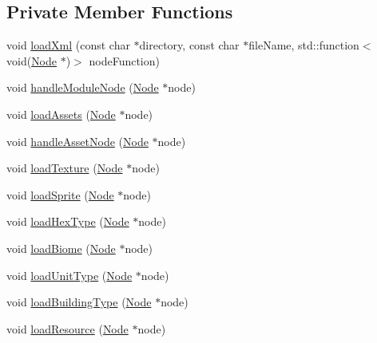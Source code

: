 \subsection*{Private Member Functions}
\begin{DoxyCompactItemize}
\item 
void \hyperlink{class_asset_manager_aec40b122db2f081d2b06de1f759897ed}{load\+Xml} (const char $\ast$directory, const char $\ast$file\+Name, std\+::function$<$ void(\hyperlink{class_asset_manager_1_1_node}{Node} $\ast$)$>$ node\+Function)
\item 
void \hyperlink{class_asset_manager_a8623b7db629dbebb3c27fd19eb1f7bdb}{handle\+Module\+Node} (\hyperlink{class_asset_manager_1_1_node}{Node} $\ast$node)
\item 
void \hyperlink{class_asset_manager_ab28406baefcbab2de39fa37a6b6e058f}{load\+Assets} (\hyperlink{class_asset_manager_1_1_node}{Node} $\ast$node)
\item 
void \hyperlink{class_asset_manager_ac8a2d469c747ee3ed69b0756b34b221a}{handle\+Asset\+Node} (\hyperlink{class_asset_manager_1_1_node}{Node} $\ast$node)
\item 
void \hyperlink{class_asset_manager_acc8ffdac1c10300a4964e8c8d5764ddd}{load\+Texture} (\hyperlink{class_asset_manager_1_1_node}{Node} $\ast$node)
\item 
void \hyperlink{class_asset_manager_adbb50534471c66993a4a8df81414bdbd}{load\+Sprite} (\hyperlink{class_asset_manager_1_1_node}{Node} $\ast$node)
\item 
void \hyperlink{class_asset_manager_a6c90c782668a85ef5539bec84d6e5aac}{load\+Hex\+Type} (\hyperlink{class_asset_manager_1_1_node}{Node} $\ast$node)
\item 
void \hyperlink{class_asset_manager_a8fc5263cd5007fe968a1d040f9b7c331}{load\+Biome} (\hyperlink{class_asset_manager_1_1_node}{Node} $\ast$node)
\item 
void \hyperlink{class_asset_manager_acda0591566b5fc9dd11264dfb384a700}{load\+Unit\+Type} (\hyperlink{class_asset_manager_1_1_node}{Node} $\ast$node)
\item 
void \hyperlink{class_asset_manager_a586cabaf670eb3552bb3c52b7edcbc1e}{load\+Building\+Type} (\hyperlink{class_asset_manager_1_1_node}{Node} $\ast$node)
\item 
void \hyperlink{class_asset_manager_acd58c4bf639bce1267a85451d6524c4f}{load\+Resource} (\hyperlink{class_asset_manager_1_1_node}{Node} $\ast$node)
\end{DoxyCompactItemize}
